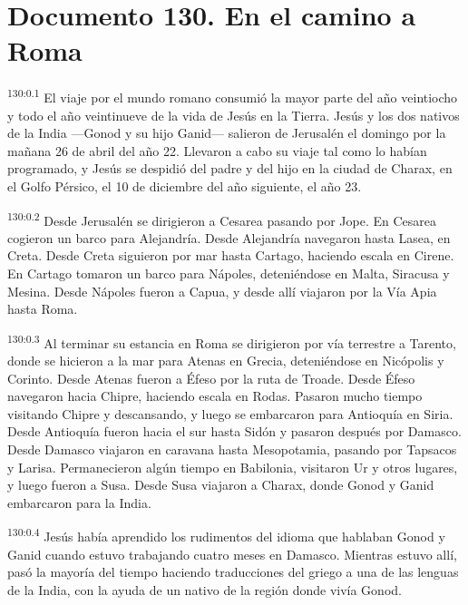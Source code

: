 \chapter{Documento 130. En el camino a Roma}
\par
\textsuperscript{130:0.1} El viaje por el mundo romano consumió la mayor parte del año veintiocho y todo el año veintinueve de la vida de Jesús en la Tierra. Jesús y los dos nativos de la India ---Gonod y su hijo Ganid--- salieron de Jerusalén el domingo por la mañana 26 de abril del año 22. Llevaron a cabo su viaje tal como lo habían programado, y Jesús se despidió del padre y del hijo en la ciudad de Charax, en el Golfo Pérsico, el 10 de diciembre del año siguiente, el año 23.

\par
\textsuperscript{130:0.2} Desde Jerusalén se dirigieron a Cesarea pasando por Jope. En Cesarea cogieron un barco para Alejandría. Desde Alejandría navegaron hasta Lasea, en Creta. Desde Creta siguieron por mar hasta Cartago, haciendo escala en Cirene. En Cartago tomaron un barco para Nápoles, deteniéndose en Malta, Siracusa y Mesina. Desde Nápoles fueron a Capua, y desde allí viajaron por la Vía Apia hasta Roma.

\par
\textsuperscript{130:0.3} Al terminar su estancia en Roma se dirigieron por vía terrestre a Tarento, donde se hicieron a la mar para Atenas en Grecia, deteniéndose en Nicópolis y Corinto. Desde Atenas fueron a Éfeso por la ruta de Troade. Desde Éfeso navegaron hacia Chipre, haciendo escala en Rodas. Pasaron mucho tiempo visitando Chipre y descansando, y luego se embarcaron para Antioquía en Siria. Desde Antioquía fueron hacia el sur hasta Sidón y pasaron después por Damasco. Desde Damasco viajaron en caravana hasta Mesopotamia, pasando por Tapsacos y Larisa. Permanecieron algún tiempo en Babilonia, visitaron Ur y otros lugares, y luego fueron a Susa. Desde Susa viajaron a Charax, donde Gonod y Ganid embarcaron para la India.

\par
\textsuperscript{130:0.4} Jesús había aprendido los rudimentos del idioma que hablaban Gonod y Ganid cuando estuvo trabajando cuatro meses en Damasco. Mientras estuvo allí, pasó la mayoría del tiempo haciendo traducciones del griego a una de las lenguas de la India, con la ayuda de un nativo de la región donde vivía Gonod.

